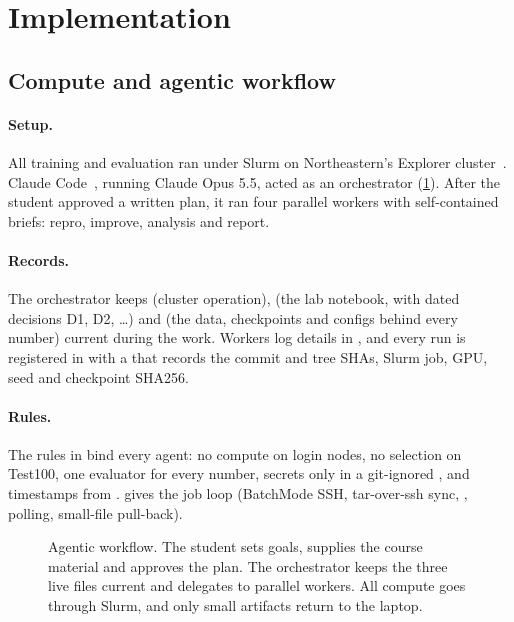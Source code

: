 \section{Implementation}\label{sec:impl}

\subsection{Compute and agentic workflow}\label{sec:workflow}

\paragraph{Setup.} All training and evaluation ran under Slurm on Northeastern's Explorer cluster~\citep{explorerdocs}.
Claude Code~\citep{claudecode}, running Claude Opus 5.5, acted as an orchestrator (\cref{fig:workflow}). After the student approved a written plan, it ran four parallel workers with self-contained briefs: repro, improve, analysis and report.

\paragraph{Records.} The orchestrator keeps  (cluster operation),  (the lab notebook, with dated decisions D1, D2, \dots) and  (the data, checkpoints and configs behind every number) current during the work. Workers log details in , and every run is registered in  with a  that records the commit and tree SHAs, Slurm job, GPU, seed and checkpoint SHA256.

\paragraph{Rules.} The rules in  bind every agent: no compute on login nodes, no selection on Test100, one evaluator for every number, secrets only in a git-ignored , and timestamps from .
 gives the job loop (BatchMode SSH, tar-over-ssh sync, , polling, small-file pull-back).

\begin{figure}[t]
  \centering
  \resizebox{0.86\linewidth}{!}{}
  \caption{Agentic workflow. The student sets goals, supplies the course material and approves the plan. The orchestrator keeps the three live files current and delegates to parallel workers. All compute goes through Slurm, and only small artifacts return to the laptop.}
  \label{fig:workflow}
\end{figure}

